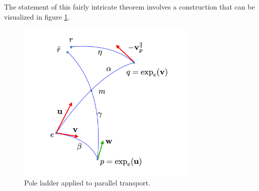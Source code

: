 The statement of this fairly intricate theorem involves a construction that can be visualized in figure \ref{fig:theorem_pict}.
\begin{figure}[htbp]
	\centering
	\includegraphics[width=8.5cm]{figures/theorem_pict.pdf}
	\caption{Pole ladder applied to parallel transport.}
	\label{fig:theorem_pict}
\end{figure}
